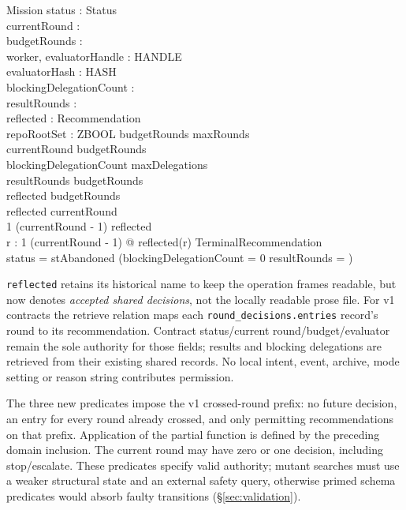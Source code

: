 \documentclass[a4paper,10pt,fleqn]{article}
\newcommand{\field}[1]{\ifmmode\texttt{#1}\else\texorpdfstring{\breakfield{#1}}{#1}\fi}
\begin{document}
\begin{schema}{Mission}
status : Status \\
currentRound : \nat \\
budgetRounds : \nat \\
worker, evaluatorHandle : HANDLE \\
evaluatorHash : HASH \\
blockingDelegationCount : \nat \\
resultRounds : \finset \nat \\
reflected : \nat \pfun Recommendation \\
repoRootSet : ZBOOL
\where
budgetRounds  \upto maxRounds \\
currentRound  \upto budgetRounds \\
blockingDelegationCount \leq maxDelegations \\
resultRounds  \upto budgetRounds \\
\dom reflected  \upto budgetRounds \\
\dom reflected  \upto currentRound \\
1 \upto (currentRound - 1) \subseteq \dom reflected \\
\forall r : 1 \upto (currentRound - 1) @
  reflected(r) \notin TerminalRecommendation \\
status = stAbandoned \implies
  (blockingDelegationCount = 0 \land resultRounds = \emptyset)
\end{schema}

\field{reflected} retains its historical name to keep the operation
frames readable, but now denotes \emph{accepted shared decisions}, not
the locally readable prose file. For v1 contracts the retrieve relation
maps each \field{round\_decisions.entries} record's round to its
recommendation. Contract status/current round/budget/evaluator remain
the sole authority for those fields; results and blocking delegations
are retrieved from their existing shared records. No local intent,
event, archive, mode setting or reason string contributes permission.

The three new predicates impose the v1 crossed-round prefix: no future
decision, an entry for every round already crossed, and only permitting
recommendations on that prefix. Application of the partial function is
defined by the preceding domain inclusion. The current round may have
zero or one decision, including stop/escalate. These predicates specify
valid authority; mutant searches must use a weaker structural state
and an external safety query, otherwise primed schema predicates would
absorb faulty transitions (\S\ref{sec:validation}).
\end{document}
